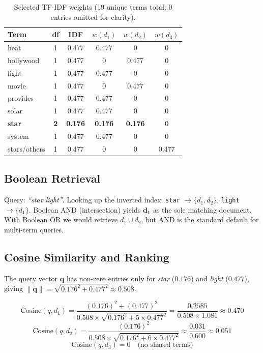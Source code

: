 \documentclass{svproc}
\begin{document}
    \begin{table}[H]
    \centering
    \renewcommand{\arraystretch}{1.2}
    \begin{tabular}{lccccc}
    \toprule
    \textbf{Term} & \textbf{df} & \textbf{IDF} & $w(d_1)$ & $w(d_2)$ & $w(d_3)$ \\
    \midrule
    heat       & 1 & 0.477 & 0.477 & 0     & 0     \\
    hollywood  & 1 & 0.477 & 0     & 0.477 & 0     \\
    light      & 1 & 0.477 & 0.477 & 0     & 0     \\
    movie      & 1 & 0.477 & 0     & 0.477 & 0     \\
    provides   & 1 & 0.477 & 0.477 & 0     & 0     \\
    solar      & 1 & 0.477 & 0.477 & 0     & 0     \\
    \textbf{star} & \textbf{2} & \textbf{0.176} & \textbf{0.176} & \textbf{0.176} & 0 \\
    system     & 1 & 0.477 & 0.477 & 0     & 0     \\
    stars/others & 1 & 0.477 & 0 & 0 & 0.477 \\
    \bottomrule
    \end{tabular}
    \caption{Selected TF-IDF weights (19 unique terms total; 0 entries omitted for clarity).}
    \end{table}

    \subsection{Boolean Retrieval}

    Query: \textit{``star light''}. Looking up the inverted index: \texttt{star} $\to \{d_1, d_2\}$, \texttt{light} $\to \{d_1\}$. Boolean AND (intersection) yields $\mathbf{d_1}$ as the sole matching document. With Boolean OR we would retrieve $d_1 \cup d_2$, but AND is the standard default for multi-term queries.

    \subsection{Cosine Similarity and Ranking}

    The query vector $\mathbf{q}$ has non-zero entries only for \textit{star} ($0.176$) and \textit{light} ($0.477$), giving $\|\mathbf{q}\| = \sqrt{0.176^2 + 0.477^2} \approx 0.508$.

    \[
    \mathrm{Cosine}(q, d_1) = \frac{(0.176)^2 + (0.477)^2}{0.508 \times \sqrt{0.176^2 + 5 \times 0.477^2}} = \frac{0.2585}{0.508 \times 1.081} \approx \mathbf{0.470}
    \]
    \[
    \mathrm{Cosine}(q, d_2) = \frac{(0.176)^2}{0.508 \times \sqrt{0.176^2 + 6 \times 0.477^2}} \approx \frac{0.031}{0.600} \approx \mathbf{0.051}
    \]
    \[
    \mathrm{Cosine}(q, d_3) = 0 \quad \text{(no shared terms)}
    \]
\end{document}
